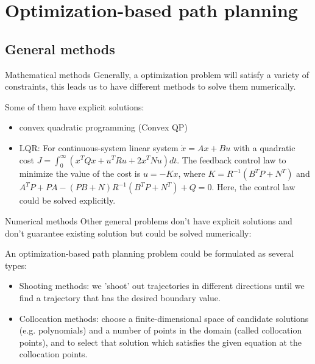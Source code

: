 \documentclass{beamer}
\newcommand{\red}[1]{{\color{red} #1}}
\begin{document}
\section{Optimization-based path planning}
\subsection{General methods}
\begin{frame}{Mathematical methods}
	Generally, a optimization problem will satisfy a variety of constraints, this leads us to have different methods to solve them numerically.
	
	Some of them have explicit solutions:
	\begin{itemize}
		\item convex quadratic programming (Convex QP)
		\item LQR: For continuous-system linear system $\dot{x} = Ax + Bu$ with a quadratic cost
		$J = \int_0^{\infty} (x^T Q x + u^T R u + 2x^T N u) dt$. The feedback control law to minimize the value of the cost is $u = -Kx$, where $K = R^{-1} (B^T P + N^T)$ and $A^T P + P A - (P B + N) R^{-1} (B^T P + N^T) + Q = 0$. Here, the control law could be solved \red{explicitly}. 
	\end{itemize}
\end{frame}

\begin{frame}{Numerical methods}
	Other general problems don't have explicit solutions and don't guarantee existing solution but could be solved numerically:
	
	An optimization-based path planning problem could be formulated as several types:
	\begin{itemize}
		\item Shooting methods: we 'shoot' out trajectories in different directions until we find a trajectory that has the desired boundary value.
		\item Collocation methods: choose a finite-dimensional space of candidate solutions (e.g. polynomials) and a number of points in the domain (called collocation points), and to select that solution which satisfies the given equation at the collocation points.
	\end{itemize}
\end{frame}
\end{document}
